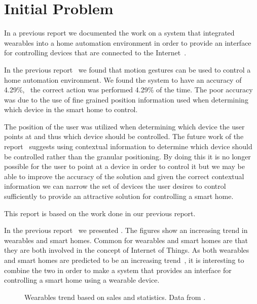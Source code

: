 \section{Initial Problem}
\label{sec:initproblem}

In a previous report we documented the work on a system that integrated wearables into a home automation environment in order to provide an interface for controlling devices that are connected to the Internet~\cite{prespecialisation}. 

In the previous report~\cite[pp. 69-73]{prespecialisation} we found that motion gestures can be used to control a home automation environment. We found the system to have an accuracy of 4.29\%, \ie~the correct action was performed 4.29\% of the time. The poor accuracy was due to the use of fine grained position information used when determining which device in the smart home to control.

The position of the user was utilized when determining which device the user points at and thus which device should be controlled. The future work of the report~\cite[pp. 71-73]{prespecialisation} suggests using contextual information to determine which device should be controlled rather than the granular positioning. By doing this it is no longer possible for the user to point at a device in order to control it but we may be able to improve the accuracy of the solution and given the correct contextual information we can narrow the set of devices the user desires to control sufficiently to provide an attractive solution for controlling a smart home.

This report is based on the work done in our previous report.

In the previous report~\cite[pp. 1-4]{prespecialisation} we presented . The figures show an increasing trend in wearables and smart homes. Common for wearables and smart homes are that they are both involved in the concept of Internet of Things. As both wearables and smart homes are predicted to be an increasing trend~\cite{WEARABLESTRENDNUMBERS,SMARTHOMETREND}, it is interesting to combine the two in order to make a system that provides an interface for controlling a smart home using a wearable device.

\begin{figure}[!hbt]
  \centering
  
  \caption{Wearables trend based on sales and statistics. Data from \protect\cite{WEARABLESTRENDNUMBERS}.}
  \label{fig:wearables-trend}
\end{figure}

